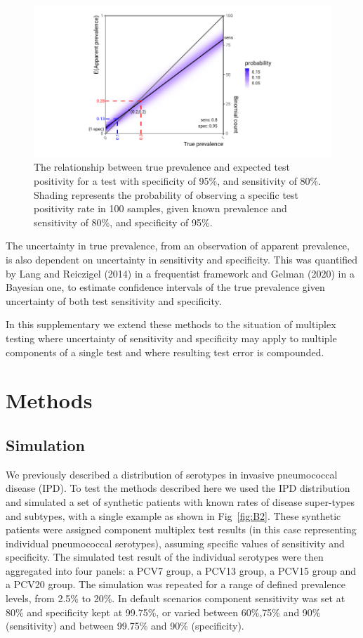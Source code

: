 \documentclass[a4paper, 12pt, twoside]{article}
\let\Oldsection\section
\renewcommand{\section}{\FloatBarrier\Oldsection}
\let\Oldsubsection\subsection
\renewcommand{\subsection}{\FloatBarrier\Oldsubsection}
\begin{document}
\begin{figure}[h!]
\centering
  \includegraphics{fig/rogan-gladen-v2}
  \caption{The relationship between true prevalence and expected test positivity for a test with specificity of 95\%, and sensitivity of 80\%. Shading represents the probability of observing a specific test positivity rate in 100 samples, given known prevalence and sensitivity of 80\%, and specificity of 95\%.}
\label{fig:B1}
\end{figure}

The uncertainty in true prevalence, from an observation of apparent prevalence, is also dependent on uncertainty in sensitivity and specificity. This was quantified by Lang and Reiczigel (2014)\cite{lang2014,flor2020} in a frequentist framework and Gelman (2020)\cite{gelman2020,flor2020} in a Bayesian one, to estimate confidence intervals of the true prevalence given uncertainty of both test sensitivity and specificity.

In this supplementary we extend these methods to the situation of multiplex testing where uncertainty of sensitivity and specificity may apply to multiple components of a single test and where resulting test error is compounded.

\section{Methods}
\subsection{Simulation}

We previously described a distribution of serotypes in invasive pneumococcal disease (IPD)\cite{hyams2023a}. To test the methods described here we used the IPD distribution and simulated a set of synthetic patients with known rates of disease super-types and subtypes, with a single example as shown in Fig~\ref{fig:B2}. These synthetic patients were assigned component multiplex test results (in this case representing individual pneumococcal serotypes), assuming specific values of sensitivity and specificity. The simulated test result of the individual serotypes were then aggregated into four panels: a PCV7 group, a PCV13 group, a PCV15 group and a PCV20 group. The simulation was repeated for a range of defined prevalence levels, from 2.5\% to 20\%. In default scenarios component sensitivity was set at 80\% and specificity kept at 99.75\%, or varied between 60\%,75\% and 90\% (sensitivity) and between 99.75\% and 90\% (specificity).
\end{document}
